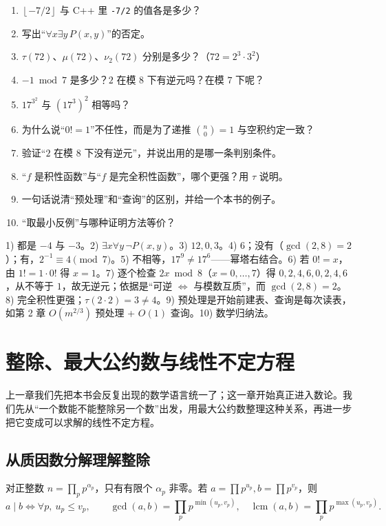 \documentclass[UTF8,a4paper,11pt,twoside,openright,fontset=fandol]{ctexbook}
\theoremstyle{definition}
\newcommand{\lcm}{\operatorname{lcm}}
\newcommand{\floor}[1]{\left\lfloor #1\right\rfloor}
\begin{document}
\begin{enumerate}
\item $\floor{-7/2}$ 与 C++ 里 \texttt{-7/2} 的值各是多少？
\item 写出“$\forall x\exists y\,P(x,y)$”的否定。
\item $\tau(72)$、$\mu(72)$、$\nu_2(72)$ 分别是多少？（$72=2^3\cdot3^2$）
\item $-1\bmod 7$ 是多少？$2$ 在模 $8$ 下有逆元吗？在模 $7$ 下呢？
\item $17^{3^{2}}$ 与 $(17^3)^2$ 相等吗？
\item 为什么说“$0!=1$”不任性，而是为了递推 $\binom{n}{0}=1$ 与空积约定一致？
\item 验证“$2$ 在模 $8$ 下没有逆元”，并说出用的是哪一条判别条件。
\item “$f$ 是积性函数”与“$f$ 是完全积性函数”，哪个更强？用 $\tau$ 说明。
\item 一句话说清“预处理”和“查询”的区别，并给一个本书的例子。
\item “取最小反例”与哪种证明方法等价？
\end{enumerate}

\begin{tip}[参考答案]
1) 都是 $-4$ 与 $-3$。2) $\exists x\forall y\,\lnot P(x,y)$。3) $12,0,3$。4) $6$；没有（$\gcd(2,8)=2$）；有，$2^{-1}\equiv4\pmod 7$。5) 不相等，$17^{9}\ne17^{6}$——幂塔右结合。6) 若 $0!=x$，由 $1!=1\cdot0!$ 得 $x=1$。7) 逐个检查 $2x\bmod 8$（$x=0,\ldots,7$）得 $0,2,4,6,0,2,4,6$，从不等于 $1$，故无逆元；依据是“可逆 $\iff$ 与模数互质”，而 $\gcd(2,8)=2$。8) 完全积性更强；$\tau(2\cdot2)=3\ne4$。9) 预处理是开始前建表、查询是每次读表，如第 2 章 $O(m^{2/3})$ 预处理 + $O(1)$ 查询。10) 数学归纳法。
\end{tip}


\chapter{整除、最大公约数与线性不定方程}
\begin{chapterintro}[章节导读]
上一章我们先把本书会反复出现的数学语言统一了；这一章开始真正进入数论。我们先从“一个数能不能整除另一个数”出发，用最大公约数整理这种关系，再进一步把它变成可以求解的线性不定方程。
\end{chapterintro}

\section{从质因数分解理解整除}
对正整数 $n=\prod_p p^{\alpha_p}$，只有有限个 $\alpha_p$ 非零。若 $a=\prod p^{u_p},b=\prod p^{v_p}$，则
\[
 a\mid b\iff\forall p,\ u_p\le v_p,\qquad
 \gcd(a,b)=\prod_p p^{\min(u_p,v_p)},\quad
 \lcm(a,b)=\prod_p p^{\max(u_p,v_p)}.
\]
\end{document}
